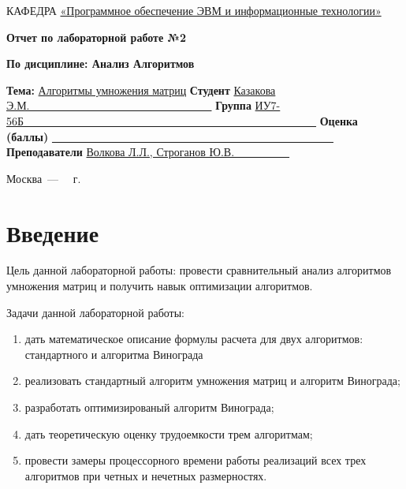 \documentclass[a4paper,12pt]{article}
\newcommand{\anonsection}[1]{\section*{#1}\addcontentsline{toc}{section}{#1}}
\begin{document}
\begin{titlepage}
		\noindent КАФЕДРА \underline{«Программное обеспечение ЭВМ и информационные технологии»}\newline\newline\newline\newline\newline\newline\newline
		
		\begin{center}
			\Large\textbf{\qquad\qquad Отчет по лабораторной работе №2} \newline
		\end{center}
		
		\begin{center}
			\textbf{\qquad\qquad       По дисциплине: Анализ Алгоритмов} \newline
		\end{center}
		\textbf{\qquad\qquad\qquad Тема: } \underline{Алгоритмы умножения матриц} \newline\newline\newline
		\textbf{\qquad Студент} \underline{Казакова Э.М.~~~~~~~~~~~~~~~~~~~~~~~~~~~~~~~~~}\newline\newline
		\textbf{\qquad Группа} \underline{ИУ7-56Б~~~~~~~~~~~~~~~~~~~~~~~~~~~~~~~~~~~~~~~~~~~~~~~~~~~~~}\newline\newline
		\textbf{\qquad Оценка (баллы)} \underline{~~~~~~~~~~~~~~~~~~~~~~~~~~~~~~~~~~~~~~~~~~~~~~~~~~~}\newline\newline
		\textbf{\qquad Преподаватели} \underline{Волкова Л.Л., Строганов Ю.В.~~~~~~~~~~}\newline
		
		\begin{center}
			\vfill
			Москва~---~\the\year
			~г.
		\end{center}
	\end{titlepage}
	
	\tableofcontents
	\newpage
	
	\anonsection{Введение}
	\hfill
	
	Цель данной лабораторной работы: провести сравнительный анализ
	алгоритмов умножения матриц и получить навык оптимизации алгоритмов.
	
	Задачи данной лабораторной работы:
	\begin{enumerate}
		\item дать математическое описание формулы расчета для двух алгоритмов: стандартного и алгоритма Винограда
		\item реализовать стандартный алгоритм умножения матриц и алгоритм
		Винограда;
		\item разработать оптимизированый алгоритм Винограда;
		\item дать теоретическую оценку трудоемкости трем алгоритмам;
		\item провести замеры процессорного времени работы реализаций всех трех
		алгоритмов при четных и нечетных размерностях.
	\end{enumerate}
\end{document}
